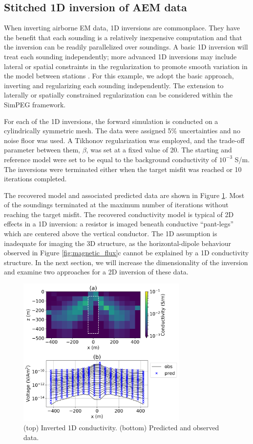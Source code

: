 \documentclass[paper]{geophysics}
\begin{document}
\subsection{Stitched 1D inversion of AEM data}
When inverting airborne EM data, 1D inversions are commonplace. They have the benefit that each sounding is a relatively inexpensive computation and that the inversion can be readily parallelized over soundings. A basic 1D inversion will treat each sounding independently; more advanced 1D inversions may include lateral or spatial constraints in the regularization to promote smooth variation in the model between stations \citep{Viezzoli2008,Viezzoli2009}. For this example, we adopt the basic approach, inverting and regularizing each sounding independently. The extension to laterally or spatially constrained regularization can be considered within the SimPEG framework.

For each of the 1D inversions, the forward simulation is conducted on a cylindrically symmetric mesh. The data were assigned 5$\%$ uncertainties and no noise floor was used. A Tikhonov regularization was employed, and the trade-off parameter between them, $\beta$, was set at a fixed value of 20. The starting and reference model were set to be equal to the background conductivity of $10^{-3}$ S/m. The inversions were terminated either when the target misfit was reached or 10 iterations completed.

The recovered model and associated predicted data are shown in Figure \ref{fig:1Dinversion}. Most of the soundings terminated at the maximum number of iterations without reaching the target misfit. The recovered conductivity model is typical of 2D effects in a 1D inversion: a resistor is imaged beneath conductive ``pant-legs'' which are centered above the vertical conductor. The 1D assumption is inadequate for imaging the 3D structure, as the horizontal-dipole behaviour observed in Figure \ref{fig:magnetic_flux}c cannot be explained by a 1D conductivity structure. In the next section, we will increase the dimensionality of the inversion and examine two approaches for a 2D inversion of these data.

\begin{figure}[!htb]
  \centering
  \includegraphics[width=0.75\textwidth]{figures/1Dinversion.png}
  \caption{(top) Inverted 1D conductivity. (bottom) Predicted and observed data.}
  \label{fig:1Dinversion}
\end{figure}
\end{document}

